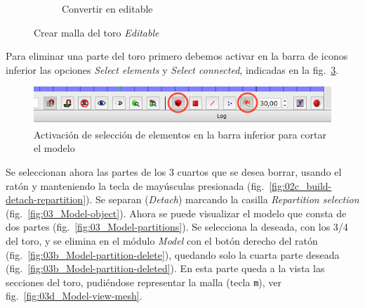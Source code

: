 \begin{figure}[!ht]
\begin{subfigure}[b]{0.30\textwidth}
\caption{Convertir en editable}
\label{fig:02_build-mesh-editable}
\end{subfigure}
\caption{Crear malla del toro \emph{Editable}}
\label{fig:02_build-mesh-torus-editable}
\end{figure}

Para eliminar una parte del toro primero debemos activar en la barra de iconos inferior las opciones \emph{Select elements} y \emph{Select connected}, indicadas en la fig.~\ref{fig:02d_selection-bar}.
\begin{figure}[!ht]
\centering
\includegraphics[width=\linewidth]{figuras_4/02d_selection-bar.png}
\caption{Activación de selección de elementos en la barra inferior para cortar el modelo}
\label{fig:02d_selection-bar}
\end{figure}
Se seleccionan ahora las partes de los 3 cuartos que se desea borrar, usando el ratón y manteniendo la tecla de mayúsculas presionada (fig.~\ref{fig:02c_build-detach-repartition}). 
Se separan (\emph{Detach}) marcando la casilla \emph{Repartition selection} (fig.~\ref{fig:03_Model-object}).
Ahora se puede visualizar el modelo que consta de dos partes (fig.~\ref{fig:03_Model-partitions}).
Se selecciona la deseada, con los 3/4 del toro, y se elimina en el módulo \emph{Model} con el botón derecho del ratón (fig.~\ref{fig:03b_Model-partition-delete}), quedando solo la cuarta parte deseada (fig.~\ref{fig:03b_Model-partition-deleted}).
En esta parte queda a la vista las secciones del toro, pudiéndose representar la malla (tecla \texttt{m}), ver fig.~\ref{fig:03d_Model-view-mesh}.
